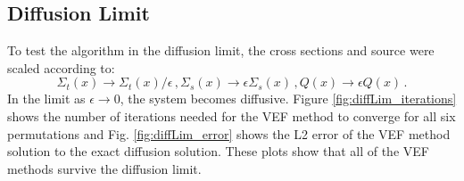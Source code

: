 \subsection{Diffusion Limit}
To test the algorithm in the diffusion limit, the cross sections and source were scaled according to: 
	\begin{subequations} \label{res:scaling}
	\begin{equation} 
		\Sigma_t(x) \rightarrow \Sigma_t(x)/\epsilon\,, 
	\end{equation}
	\begin{equation}
		\Sigma_s(x) \rightarrow \epsilon \Sigma_s(x) \,,
	\end{equation}
	\begin{equation}
		Q(x) \rightarrow \epsilon Q(x)\,. 
	\end{equation}
	\end{subequations}
In the limit as $\epsilon \rightarrow 0$, the system becomes diffusive. Figure \ref{fig:diffLim_iterations} shows the number of iterations needed for the VEF method to converge for all six permutations and Fig. \ref{fig:diffLim_error} shows the L2 error of the VEF method solution to the exact diffusion solution. These plots show that all of the VEF methods survive the diffusion limit. 

